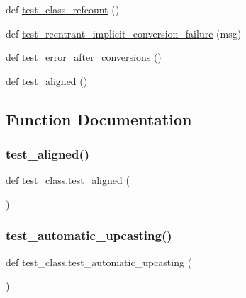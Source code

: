 \begin{DoxyCompactItemize}
\item 
def \mbox{\hyperlink{namespacetest__class_a258b839aedc1ccbd7a3de21ca4f0e048}{test\+\_\+class\+\_\+refcount}} ()
\item 
def \mbox{\hyperlink{namespacetest__class_a8cd6c6d851403dbb363b293e59bbcb9e}{test\+\_\+reentrant\+\_\+implicit\+\_\+conversion\+\_\+failure}} (msg)
\item 
def \mbox{\hyperlink{namespacetest__class_aa00b22febc5e2eb6f9ac501432a61ec2}{test\+\_\+error\+\_\+after\+\_\+conversions}} ()
\item 
def \mbox{\hyperlink{namespacetest__class_a902998050f1d9a69b72bf88af5a828bd}{test\+\_\+aligned}} ()
\end{DoxyCompactItemize}


\subsection{Function Documentation}
\mbox{\label{namespacetest__class_a902998050f1d9a69b72bf88af5a828bd}} 
\subsubsection{\texorpdfstring{test\_aligned()}{test\_aligned()}}
{\footnotesize\ttfamily def test\+\_\+class.\+test\+\_\+aligned (\begin{DoxyParamCaption}{ }\end{DoxyParamCaption})}

\mbox{\label{namespacetest__class_ac62eac725c22058ddc5bde8458eaf68c}} 
\subsubsection{\texorpdfstring{test\_automatic\_upcasting()}{test\_automatic\_upcasting()}}
{\footnotesize\ttfamily def test\+\_\+class.\+test\+\_\+automatic\+\_\+upcasting (\begin{DoxyParamCaption}{ }\end{DoxyParamCaption})}

\mbox{\label{namespacetest__class_a89e248bef059bdbbcb145489a0701cb3}} 
